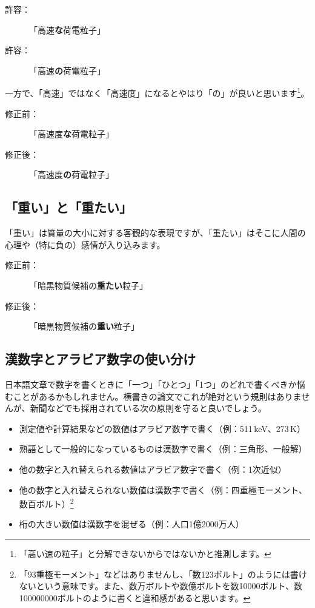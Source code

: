 \begin{description}
\item[許容：]「高速\textbf{な}荷電粒子」
\item[許容：]「高速\textbf{の}荷電粒子」
\end{description}

一方で、「高速」ではなく「高速度」になるとやはり「の」が良いと思います\footnote{「高い速の粒子」と分解できないからではないかと推測します。}。

\begin{description}
\item[修正前：]「高速度\textbf{な}荷電粒子」
\item[修正後：]「高速度\textbf{の}荷電粒子」
\end{description}

\subsection{「重い」と「重たい」}

「重い」は質量の大小に対する客観的な表現ですが、「重たい」はそこに人間の心理や（特に負の）感情が入り込みます。

\begin{description}
\item[修正前：]「暗黒物質候補の\textbf{重たい}粒子」
\item[修正後：]「暗黒物質候補の\textbf{重い}粒子」
\end{description}

\subsection{漢数字とアラビア数字の使い分け}

日本語文章で数字を書くときに「一つ」「ひとつ」「1つ」のどれで書くべきか悩むことがあるかもしれません。横書きの論文でこれが絶対という規則はありませんが、新聞などでも採用されている次の原則を守ると良いでしょう。

\begin{itemize}
\item 測定値や計算結果などの数値はアラビア数字で書く（例：511\,keV、273\,K）
\item 熟語として一般的になっているものは漢数字で書く（例：三角形、一般解）
\item 他の数字と入れ替えられる数値はアラビア数字で書く（例：1次近似）
\item 他の数字と入れ替えられない数値は漢数字で書く（例：四重極モーメント、数百ボルト）\footnote{「93重極モーメント」などはありませんし、「数123ボルト」のようには書けないという意味です。また、数万ボルトや数億ボルトを数10000ボルト、数100000000ボルトのように書くと違和感があると思います。}
\item 桁の大きい数値は漢数字を混ぜる（例：人口1億2000万人）
\end{itemize}

